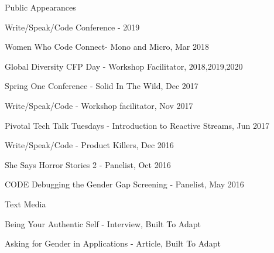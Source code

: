 \documentclass[10pt]{article}
\begin{document}
{	\project
	{Public Appearances}
	{}
	{}
	{\begin{newitemize}
		\item Write/Speak/Code Conference - 2019
		\item Women Who Code Connect- Mono and Micro, Mar 2018
		\item Global Diversity CFP Day - Workshop Facilitator, 2018,2019,2020
		\item Spring One Conference - Solid In The Wild, Dec 2017
		\item Write/Speak/Code - Workshop facilitator, Nov 2017
		\item Pivotal Tech Talk Tuesdays - Introduction to Reactive Streams, Jun 2017
		\item Write/Speak/Code - Product Killers, Dec 2016
		\item She Says Horror Stories 2 - Panelist, Oct 2016
		\item CODE Debugging the Gender Gap Screening - Panelist, May 2016
	\end{newitemize}
	}
	
	\project
	{Text Media}
	{}
	{}
	{\begin{newitemize}
		\item Being Your Authentic Self - Interview, Built To Adapt
\item Asking for Gender in Applications - Article, Built To Adapt	\end{newitemize}
	}
}
	
	\ 
\end{document}
